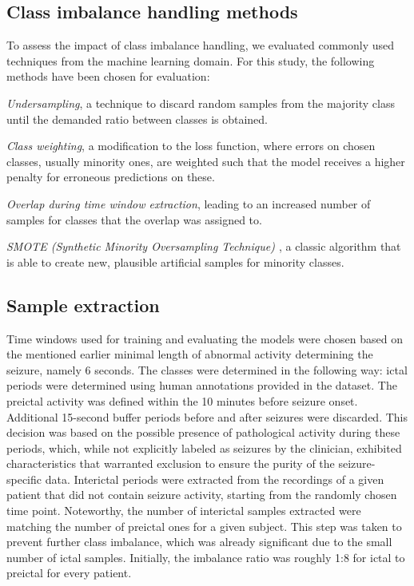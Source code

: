 \documentclass[a4paper,fleqn]{cas-sc}
\begin{document}
\subsection{Class imbalance handling methods}
To assess the impact of class imbalance handling, we evaluated commonly used techniques from the machine learning domain. For this study, the following methods have been chosen for evaluation:

\textit{Undersampling}, a technique to discard random samples from the majority class until the demanded ratio between classes is obtained.

\textit{Class weighting}, a modification to the loss function, where errors on chosen classes, usually minority ones, are weighted such that the model receives a higher penalty for erroneous predictions on these.

\textit{Overlap during time window extraction}, leading to an increased number of samples for classes that the overlap was assigned to.

\textit{SMOTE (Synthetic Minority Oversampling Technique) \cite{ChawlaSMOTE}}, a classic algorithm that is able to create new, plausible artificial samples for minority classes.

\subsection{Sample extraction}

Time windows used for training and evaluating the models were chosen based on the mentioned earlier minimal length of abnormal activity determining the seizure, namely 6 seconds. The classes were determined in the following way: ictal periods were determined using human annotations provided in the dataset. The preictal activity was defined within the 10 minutes before seizure onset. Additional 15-second buffer periods before and after seizures were discarded. This decision was based on the possible presence of pathological activity during these periods, which, while not explicitly labeled as seizures by the clinician, exhibited characteristics that warranted exclusion to ensure the purity of the seizure-specific data. Interictal periods were extracted from the recordings of a given patient that did not contain seizure activity, starting from the randomly chosen time point. Noteworthy, the number of interictal samples extracted were matching the number of preictal ones for a given subject. This step was taken to prevent further class imbalance, which was already significant due to the small number of ictal samples. Initially, the imbalance ratio was roughly 1:8 for ictal to preictal for every patient.
\end{document}
